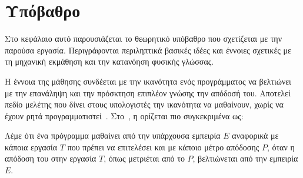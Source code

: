 \chapter{Υπόβαθρο}\label{chap:background}
Στο κεφάλαιο αυτό παρουσιάζεται το θεωρητικό υπόβαθρο που σχετίζεται με την παρούσα εργασία.
Περιγράφονται περιληπτικά βασικές ιδέες και έννοιες σχετικές με τη μηχανική εκμάθηση και την κατανόηση φυσικής γλώσσας.

Η έννοια της μάθησης συνδέεται με την ικανότητα ενός προγράμματος να βελτιώνει με την επανάληψη και την πρόσκτηση επιπλέον γνώσης την απόδοσή του.
Αποτελεί πεδίο μελέτης που δίνει στους υπολογιστές την ικανότητα να μαθαίνουν, χωρίς να έχουν ρητά προγραμματιστεί~\cite{samuel1959some}.
Στο~\cite{mitchell1990machine}, η  ορίζεται πιο συγκεκριμένα ως:
\begin{framed}
    Λέμε ότι ένα πρόγραμμα μαθαίνει από την υπάρχουσα εμπειρία $E$ αναφορικά με κάποια εργασία $T$ που πρέπει να επιτελέσει και με κάποιο μέτρο απόδοσης $P$,
    όταν η απόδοση του στην εργασία $T$, όπως μετριέται από το $P$, βελτιώνεται από την εμπειρία $E$.%
\end{framed}



